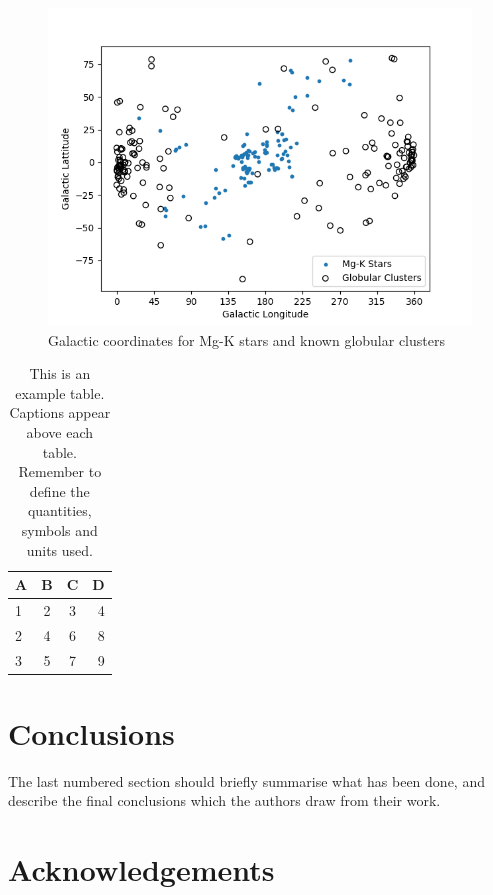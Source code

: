 \documentclass[a4paper,fleqn,usenatbib]{mnras}
\begin{document}
\begin{figure}
	\includegraphics[width=\columnwidth]{globclustof113.png}
    \caption{Galactic coordinates for Mg-K stars and known globular clusters}
    \label{mhist}
\end{figure}

\begin{table}
	\centering
	\caption{This is an example table. Captions appear above each table.
	Remember to define the quantities, symbols and units used.}
	\label{tab:example_table}
	\begin{tabular}{lccr} %
		\hline
		A & B & C & D\\
		\hline
		1 & 2 & 3 & 4\\
		2 & 4 & 6 & 8\\
		3 & 5 & 7 & 9\\
		\hline
	\end{tabular}
\end{table}


\section{Conclusions}

The last numbered section should briefly summarise what has been done, and describe
the final conclusions which the authors draw from their work.

\section*{Acknowledgements}
\end{document}
